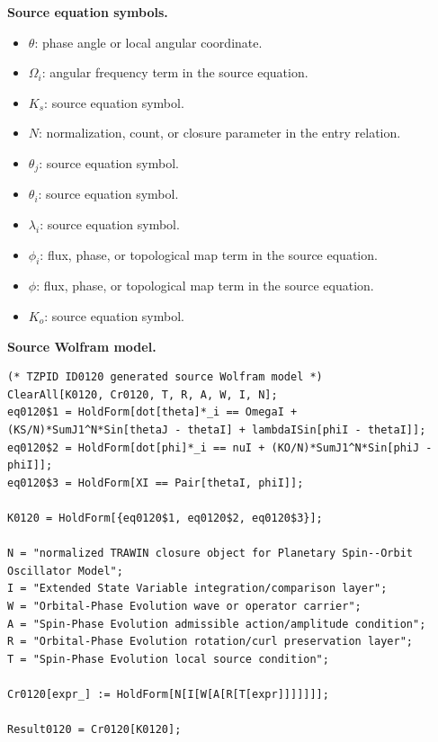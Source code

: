 \begin{minipage}[t]{0.49\linewidth}
\begingroup
\small
\raggedright
\textbf{Source equation symbols.}\par
\begin{itemize}[leftmargin=1.35em,itemsep=1pt,topsep=1pt,parsep=0pt]
    \item $\theta$: phase angle or local angular coordinate.
    \item $\Omega_i$: angular frequency term in the source equation.
    \item $K_s$: source equation symbol.
    \item $N$: normalization, count, or closure parameter in the entry relation.
    \item $\theta_j$: source equation symbol.
    \item $\theta_i$: source equation symbol.
    \item $\lambda_i$: source equation symbol.
    \item $\phi_i$: flux, phase, or topological map term in the source equation.
    \item $\phi$: flux, phase, or topological map term in the source equation.
    \item $K_o$: source equation symbol.
\end{itemize}
\endgroup
\end{minipage}\hfill
\begin{minipage}[t]{0.47\linewidth}
\begingroup
\scriptsize
\raggedright
\textbf{Source Wolfram model.}\par
\begin{Verbatim}[fontsize=\tiny,breaklines=true,breakanywhere=true]
(* TZPID ID0120 generated source Wolfram model *)
ClearAll[K0120, Cr0120, T, R, A, W, I, N];
eq0120$1 = HoldForm[dot[theta]*_i == OmegaI + (KS/N)*SumJ1^N*Sin[thetaJ - thetaI] + lambdaISin[phiI - thetaI]];
eq0120$2 = HoldForm[dot[phi]*_i == nuI + (KO/N)*SumJ1^N*Sin[phiJ - phiI]];
eq0120$3 = HoldForm[XI == Pair[thetaI, phiI]];

K0120 = HoldForm[{eq0120$1, eq0120$2, eq0120$3}];

N = "normalized TRAWIN closure object for Planetary Spin--Orbit Oscillator Model";
I = "Extended State Variable integration/comparison layer";
W = "Orbital-Phase Evolution wave or operator carrier";
A = "Spin-Phase Evolution admissible action/amplitude condition";
R = "Orbital-Phase Evolution rotation/curl preservation layer";
T = "Spin-Phase Evolution local source condition";

Cr0120[expr_] := HoldForm[N[I[W[A[R[T[expr]]]]]]];

Result0120 = Cr0120[K0120];
\end{Verbatim}
\endgroup
\end{minipage}

